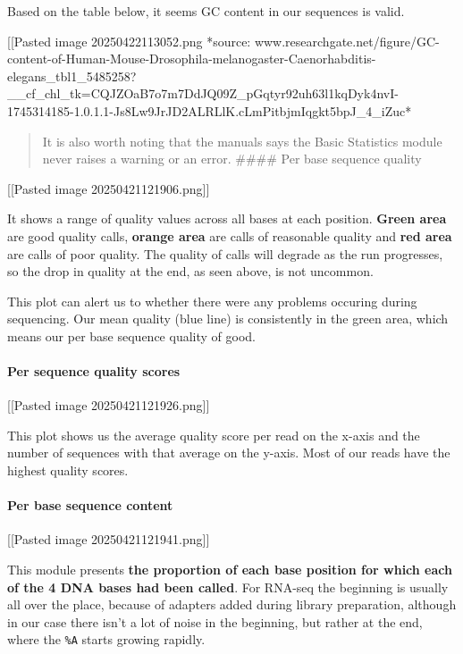 Based on the table below, it seems GC content in our sequences is valid.

{[}{[}Pasted image 20250422113052.png\textbar400{]}{]} *source:
www.researchgate.net/figure/GC-content-of-Human-Mouse-Drosophila-melanogaster-Caenorhabditis-elegans\_tbl1\_5485258?\_\_cf\_chl\_tk=CQJZOaB7o7m7DdJQ09Z\_pGqtyr92uh63l1kqDyk4nvI-1745314185-1.0.1.1-Js8Lw9JrJD2ALRLlK.cLmPitbjmIqgkt5bpJ\_4\_iZuc*

\begin{quote}
It is also worth noting that the manuals says the Basic Statistics
module never raises a warning or an error. \#\#\#\# Per base sequence
quality
\end{quote}

{[}{[}Pasted image 20250421121906.png{]}{]}

It shows a range of quality values across all bases at each position.
\textbf{Green area} are good quality calls, \textbf{orange area} are
calls of reasonable quality and \textbf{red area} are calls of poor
quality. The quality of calls will degrade as the run progresses, so the
drop in quality at the end, as seen above, is not uncommon.

This plot can alert us to whether there were any problems occuring
during sequencing. Our mean quality (blue line) is consistently in the
green area, which means our per base sequence quality of good.

\hypertarget{per-sequence-quality-scores}{%
\paragraph{Per sequence quality
scores}\label{per-sequence-quality-scores}}

{[}{[}Pasted image 20250421121926.png{]}{]}

This plot shows us the average quality score per read on the x-axis and
the number of sequences with that average on the y-axis. Most of our
reads have the highest quality scores.

\hypertarget{per-base-sequence-content}{%
\paragraph{Per base sequence content}\label{per-base-sequence-content}}

{[}{[}Pasted image 20250421121941.png{]}{]}

This module presents \textbf{the proportion of each base position for
which each of the 4 DNA bases had been called}. For RNA-seq the
beginning is usually all over the place, because of adapters added
during library preparation, although in our case there isn't a lot of
noise in the beginning, but rather at the end, where the \texttt{\%A}
starts growing rapidly.

